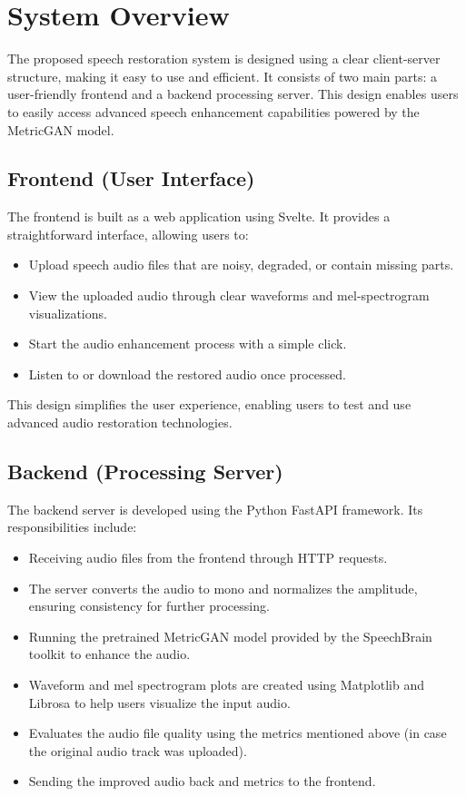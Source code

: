 \section{System Overview}

The proposed speech restoration system is designed using a clear client-server structure, making it easy to use and efficient. It consists of two main parts: a user-friendly frontend and a backend processing server. This design enables users to easily access advanced speech enhancement capabilities powered by the MetricGAN model.

\subsection{Frontend (User Interface)}

The frontend is built as a web application using Svelte. It provides a straightforward interface, allowing users to:
\begin{itemize}
    \item Upload speech audio files that are noisy, degraded, or contain missing parts.
    \item View the uploaded audio through clear waveforms and mel-spectrogram visualizations.
    \item Start the audio enhancement process with a simple click.
    \item Listen to or download the restored audio once processed.
\end{itemize}

This design simplifies the user experience, enabling users to test and use advanced audio restoration technologies.


\subsection{Backend (Processing Server)}

The backend server is developed using the Python FastAPI framework. Its responsibilities include:

\begin{itemize}
    \item Receiving audio files from the frontend through HTTP requests.
    \item The server converts the audio to mono and normalizes the amplitude, ensuring consistency for further processing.
    \item Running the pretrained MetricGAN model provided by the SpeechBrain toolkit to enhance the audio.
    \item Waveform and mel spectrogram plots are created using Matplotlib and Librosa to help users visualize the input audio.
    \item Evaluates the audio file quality using the metrics mentioned above (in case the original audio track was uploaded).
    \item Sending the improved audio back and metrics to the frontend.
\end{itemize}


